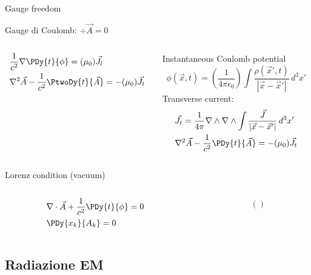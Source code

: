 \begin{frame}{Gauge freedom}

 \begin{block}{Gauge di Coulomb: $\div{\vec{A}}=0$}
\begin{columns}[T]
\begin{column}{0.5\textwidth}
        \begin{align*}
            &\frac{1}{c^2}\nabla\PDy{t}{\phi}=(\mu_0)\vec{J}_l\\
            &\nabla^2\vec{A}-\frac{1}{c^2}\PtwoDy{t}{\vec{A}}=-(\mu_0)\vec{J}_t
        \end{align*}
   
\end{column}
\begin{column}{0.5\textwidth}
Instantaneous Coulomb potential
\begin{equation*}
\phi(\vec{x},t)=(\frac{1}{4\pi\epsilon_0})\int\frac{\rho(\vec{x}',t)}{|\vec{x}-\vec{x}'|}\,d^3x'
\end{equation*}
Transverse current:
\begin{align*}
    &\vec{J}_t=\frac{1}{4\pi}\nabla\wedge\nabla\wedge\int\frac{\vec{J}}{|\vec{x}-\vec{x}'|}\,d^3x'\\
    &\nabla^2\vec{A}-\frac{1}{c^2}\PDy{t}{\vec{A}}=-(\mu_0)\vec{J}_t
\end{align*}
\end{column}
\end{columns}
        \end{block}
  \begin{block}{Lorenz condition (vacuum)}
\begin{columns}[T]
\begin{column}{0.5\textwidth}
    \begin{align*}
        &\nabla\cdot\vec{A}+\frac{1}{c^2}\PDy{t}{\phi}=0\\
        &\PDy{x_k}{A_k}=0
    \end{align*}
\end{column}
\begin{column}{0.5\textwidth}
\begin{align*}
    &()
\end{align*}
\end{column}
\end{columns}
    \end{block}

\end{frame}

\subsection{Radiazione EM}

